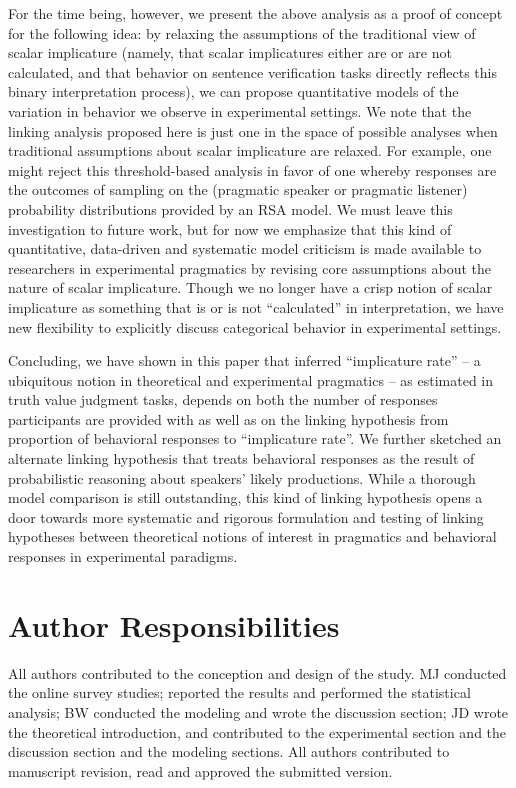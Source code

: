 \documentclass[man]{apa6}
\theoremstyle{definition}
\theoremstyle{definition}
\theoremstyle{definition}
\theoremstyle{remark}
\begin{document}
For the time being, however, we present the above analysis as a proof of
concept for the following idea: by relaxing the assumptions of the
traditional view of scalar implicature (namely, that scalar implicatures
either are or are not calculated, and that behavior on sentence
verification tasks directly reflects this binary interpretation
process), we can propose quantitative models of the variation in
behavior we observe in experimental settings. We note that the linking
analysis proposed here is just one in the space of possible analyses
when traditional assumptions about scalar implicature are relaxed. For
example, one might reject this threshold-based analysis in favor of one
whereby responses are the outcomes of sampling on the (pragmatic speaker
or pragmatic listener) probability distributions provided by an RSA
model. We must leave this investigation to future work, but for now we
emphasize that this kind of quantitative, data-driven and systematic
model criticism is made available to researchers in experimental
pragmatics by revising core assumptions about the nature of scalar
implicature. Though we no longer have a crisp notion of scalar
implicature as something that is or is not \enquote{calculated} in
interpretation, we have new flexibility to explicitly discuss
categorical behavior in experimental settings.

Concluding, we have shown in this paper that inferred
\enquote{implicature rate} -- a ubiquitous notion in theoretical and experimental
pragmatics -- as estimated in truth value judgment tasks, depends on
both the number of responses participants are provided with as well as
on the linking hypothesis from proportion of behavioral responses to
\enquote{implicature rate}. We further sketched an alternate linking
hypothesis that treats behavioral responses as the result of
probabilistic reasoning about speakers' likely productions. While a
thorough model comparison is still outstanding, this kind of linking
hypothesis opens a door towards more systematic and rigorous formulation
and testing of linking hypotheses between theoretical notions of
interest in pragmatics and behavioral responses in experimental
paradigms.


\section{Author Responsibilities}
All authors contributed to the conception and design of the study. MJ conducted the online survey studies; reported the results and performed the statistical analysis; BW conducted the modeling and wrote the discussion section; JD wrote the theoretical introduction, and contributed to the experimental section and the discussion section and the modeling sections. All authors contributed to manuscript revision, read and approved the submitted version.
\end{document}
